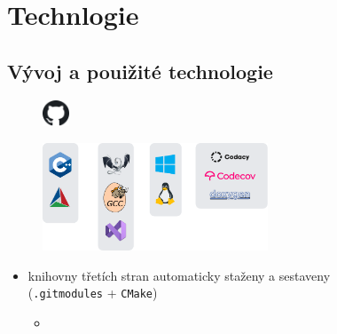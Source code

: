 \documentclass[compress]{beamer}
\begin{document}
\section{Technlogie}

\subsection{Vývoj a pouižité technologie}

\begin{frame}
	\vspace{-0.5cm}
	\begin{figure}
		\centering
		\includegraphics[width=0.07\textwidth]{img/logos/github.pdf}
	\end{figure}
	\centering
	\vspace{-0.4cm}
	\href{https://github.com/silhavyj/ZeroMate}{}
	\vspace{-0.1cm}
	\noindent\makebox[\linewidth]{\rule{\textwidth}{0.4pt}}
	\begin{figure}
		\centering
		\includegraphics[width=0.6\textwidth]{img/logos/logos.pdf}
	\end{figure}
	\vspace{-0.6cm}
	\noindent\makebox[\linewidth]{\rule{\textwidth}{0.4pt}}
	\vspace{-0.3cm}
	\begin{itemize}
		\item knihovny třetích stran automaticky staženy a sestaveny \\ (\texttt{.gitmodules} + \texttt{CMake})
		\begin{itemize}
			\item \href{https://github.com/google/googletest}{} \href{https://github.com/ocornut/imgui}{}
			\href{https://github.com/martin-olivier/dylib}{} 
			\href{https://github.com/serge1/ELFIO}{} 
			\href{https://github.com/glfw/glfw}{} 
			\href{https://github.com/capstone-engine/capstone}{}
		\end{itemize}
	\end{itemize}
\end{frame}
\end{document}
